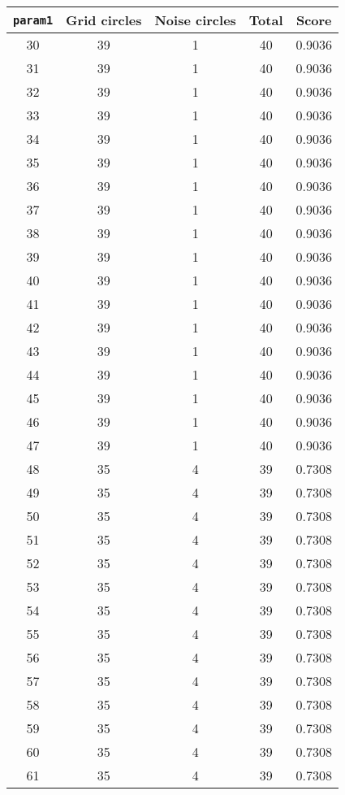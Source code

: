 \documentclass[letterpaper, 12pt]{article}
\begin{document}
\begin{longtable}{|c|c|c|c|c|}
\hline
\textbf{\texttt{param1}} & \textbf{Grid circles} & \textbf{Noise circles} & \textbf{Total} & \textbf{Score} \\
\hline
30 & 39 & 1 & 40 & 0.9036 \\
\hline
31 & 39 & 1 & 40 & 0.9036 \\
\hline
32 & 39 & 1 & 40 & 0.9036 \\
\hline
33 & 39 & 1 & 40 & 0.9036 \\
\hline
34 & 39 & 1 & 40 & 0.9036 \\
\hline
35 & 39 & 1 & 40 & 0.9036 \\
\hline
36 & 39 & 1 & 40 & 0.9036 \\
\hline
37 & 39 & 1 & 40 & 0.9036 \\
\hline
38 & 39 & 1 & 40 & 0.9036 \\
\hline
39 & 39 & 1 & 40 & 0.9036 \\
\hline
40 & 39 & 1 & 40 & 0.9036 \\
\hline
41 & 39 & 1 & 40 & 0.9036 \\
\hline
42 & 39 & 1 & 40 & 0.9036 \\
\hline
43 & 39 & 1 & 40 & 0.9036 \\
\hline
44 & 39 & 1 & 40 & 0.9036 \\
\hline
45 & 39 & 1 & 40 & 0.9036 \\
\hline
46 & 39 & 1 & 40 & 0.9036 \\
\hline
47 & 39 & 1 & 40 & 0.9036 \\
\hline
48 & 35 & 4 & 39 & 0.7308 \\
\hline
49 & 35 & 4 & 39 & 0.7308 \\
\hline
50 & 35 & 4 & 39 & 0.7308 \\
\hline
51 & 35 & 4 & 39 & 0.7308 \\
\hline
52 & 35 & 4 & 39 & 0.7308 \\
\hline
53 & 35 & 4 & 39 & 0.7308 \\
\hline
54 & 35 & 4 & 39 & 0.7308 \\
\hline
55 & 35 & 4 & 39 & 0.7308 \\
\hline
56 & 35 & 4 & 39 & 0.7308 \\
\hline
57 & 35 & 4 & 39 & 0.7308 \\
\hline
58 & 35 & 4 & 39 & 0.7308 \\
\hline
59 & 35 & 4 & 39 & 0.7308 \\
\hline
60 & 35 & 4 & 39 & 0.7308 \\
\hline
61 & 35 & 4 & 39 & 0.7308 \\

\end{longtable}
\end{document}
